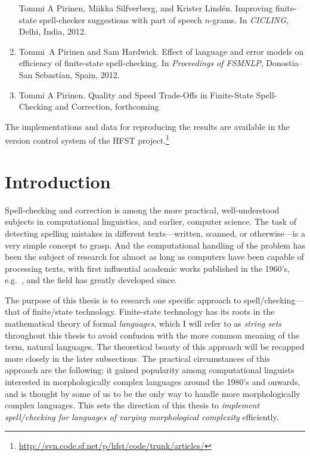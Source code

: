 \documentclass[officiallayout]{unihelcompling}
\newcommand\misspelt{\bgroup\markoverwith
{\textcolor{red}{\lower3.5pt\hbox{\sixly \char58}}}\ULon}
\begin{document}
\begin{enumerate}
        Tommi A Pirinen, Miikka Silfverberg, and Krister Lindén.
        \newblock Improving finite-state spell-checker suggestions with part of
        speech \(n\)-grams.
        \newblock In {\em CICLING}, Delhi, India, 2012.
    \item[\citetalias{pirinen2012effects}]
        Tommi~A Pirinen and Sam Hardwick.
        \newblock Effect of language and error models on
        efficiency of finite-state spell-checking.
        \newblock In {\em Proceedings of FSMNLP}, Donostia--San Sebastían, Spain, 2012.
    \item[\citetalias{pirinen2013quality}]
        Tommi A Pirinen.
        \newblock Quality and Speed Trade-Offs in
        Finite-State Spell-Checking and Correction, forthcoming
\end{enumerate}

The implementations and data for reproducing the results are available
in the version control system of the HFST
project.\footnote{\url{http://svn.code.sf.net/p/hfst/code/trunk/articles/}}

\tableofcontents

\listoftables

\listoffigures

\listoftodos

\chapter{Introduction}
\label{chap:introduction}

Spell-checking and correction is among the more practical, well-understood
subjects in computational linguistics, and earlier, computer science.  The task
of detecting spelling mistakes in different texts---written, scanned, or
otherwise---is a very simple concept to grasp. And the computational handling
of the problem has been the subject of research for almost as long as computers
have been capable of processing texts, with first influential academic works
published in the 1960's, e.g.~\cite{damerau1964technique}, and the field has
greatly developed since.

The purpose of this thesis is to research one specific approach to
spell\-/checking---that of finite\-/state technology. Finite-state technology
has its roots in the mathematical theory of formal \emph{languages}, which I
will refer to as \emph{string sets} throughout this thesis to avoid confusion
with the more common meaning of the term, natural languages. The theoretical
beauty of this approach will be recapped more closely in the later subsections.
The practical circumstances of this approach are the following: it gained
popularity among computational linguists interested in morphologically complex
languages around the 1980's and onwards, and is thought by some of us to be the
only way to handle more morphologically complex languages. This sets the
direction of this thesis to \emph{implement spell\-/checking for languages of
varying morphological complexity} efficiently.
\end{document}

